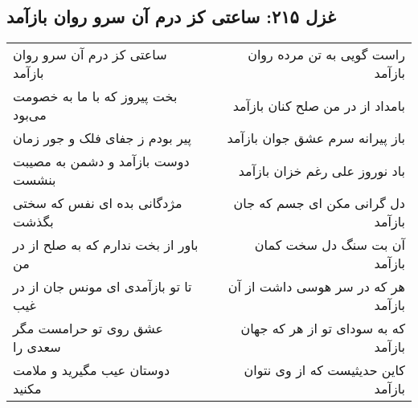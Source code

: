 \begin{center}
\section*{غزل ۲۱۵: ساعتی کز درم آن سرو روان بازآمد}
\label{sec:215}
\begin{longtable}{l p{0.5cm} r}
ساعتی کز درم آن سرو روان بازآمد
&&
راست گویی به تن مرده روان بازآمد
\\
بخت پیروز که با ما به خصومت می‌بود
&&
بامداد از در من صلح کنان بازآمد
\\
پیر بودم ز جفای فلک و جور زمان
&&
باز پیرانه سرم عشق جوان بازآمد
\\
دوست بازآمد و دشمن به مصیبت بنشست
&&
باد نوروز علی رغم خزان بازآمد
\\
مژدگانی بده ای نفس که سختی بگذشت
&&
دل گرانی مکن ای جسم که جان بازآمد
\\
باور از بخت ندارم که به صلح از در من
&&
آن بت سنگ دل سخت کمان بازآمد
\\
تا تو بازآمدی ای مونس جان از در غیب
&&
هر که در سر هوسی داشت از آن بازآمد
\\
عشق روی تو حرامست مگر سعدی را
&&
که به سودای تو از هر که جهان بازآمد
\\
دوستان عیب مگیرید و ملامت مکنید
&&
کاین حدیثیست که از وی نتوان بازآمد
\\
\end{longtable}
\end{center}

